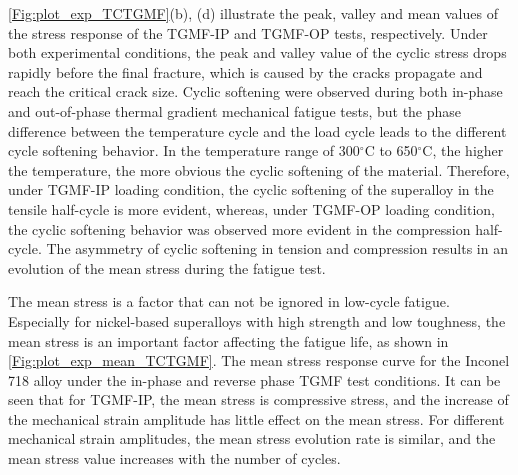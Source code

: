 \documentclass[preprint,5p,twocolumn,11pt,sort&compress]{elsarticle}
\begin{document}
\autoref{Fig:plot_exp_TCTGMF}(b), (d) illustrate the peak, valley and mean values of the stress response of the TGMF-IP and TGMF-OP tests, respectively.
Under both experimental conditions, the peak and valley value of the cyclic stress drops rapidly before the final fracture, which is caused by the cracks propagate and reach the critical crack size.
Cyclic softening were observed during both in-phase and out-of-phase thermal gradient mechanical fatigue tests, but the phase difference between the temperature cycle and the load cycle leads to the different cycle softening behavior. In the temperature range of 300$^\circ$C to 650$^\circ$C, the higher the temperature, the more obvious the cyclic softening of the material. Therefore, under TGMF-IP loading condition, the cyclic softening of the superalloy in the tensile half-cycle is more evident, whereas, under TGMF-OP loading condition, the cyclic softening behavior was observed more evident in the compression half-cycle. The asymmetry of cyclic softening in tension and compression results in an evolution of the mean stress during the fatigue test.

The mean stress is a factor that can not be ignored in low-cycle fatigue. Especially for nickel-based superalloys with high strength and low toughness, the mean stress is an important factor affecting the fatigue life, as shown in \autoref{Fig:plot_exp_mean_TCTGMF}. The mean stress response curve for the Inconel 718 alloy under the in-phase and reverse phase TGMF test conditions. It can be seen that for TGMF-IP, the mean stress is compressive stress, and the increase of the mechanical strain amplitude has little effect on the mean stress. For different mechanical strain amplitudes, the mean stress evolution rate is similar, and the mean stress value increases with the number of cycles.
\end{document}
